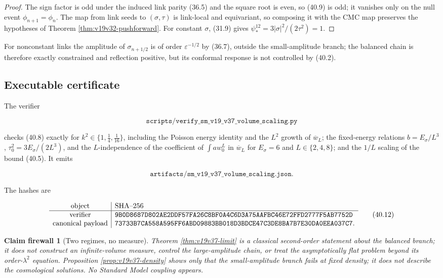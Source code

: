 \documentclass[11pt]{article}
\newtheorem{firewall}[theorem]{Claim firewall}
\theoremstyle{remark}
\begin{document}
\begin{proof}
The sign factor is odd under the induced link parity (36.5) and the
square root is even, so (40.9) is odd; it vanishes only on the null
event \(\phi_{n+1}=\phi_n\).  The map from link seeds to
\((\sigma,\tau)\) is link-local and equivariant, so composing it with the
CMC map preserves the hypotheses of Theorem
\ref{thm:v19v32-pushforward}.  For constant \(\sigma\), (31.9) gives
\(\psi_*^{12}=3|\sigma|^2/(2\tau^2)=1\).
\end{proof}

For nonconstant links the amplitude of \(\sigma_{n+1/2}\) is of order
\(\varepsilon^{-1/2}\) by (36.7), outside the small-amplitude branch;
the balanced chain is therefore exactly constrained and reflection
positive, but its conformal response is not controlled by (40.2).

\subsection{Executable certificate}

The verifier

\[
 \texttt{scripts/verify\_sm\_v19\_v37\_volume\_scaling.py}         \tag{40.10}
\]

checks (40.8) exactly for \(k^2\in\{1,\tfrac14,\tfrac1{16}\}\),
including the Poisson energy identity and the \(L^2\) growth of
\(\overline w_L\); the fixed-energy relations \(b=E_\sigma/L^3\),
\(\tau_0^2=3E_\sigma/(2L^3)\), and the \(L\)-independence of the
coefficient of \(\int aw_0^L\) in \(\overline w_L\) for \(E_\sigma=6\)
and \(L\in\{2,4,8\}\); and the \(1/L\) scaling of the bound (40.5).  It
emits

\[
 \texttt{artifacts/sm\_v19\_v37\_volume\_scaling.json}.            \tag{40.11}
\]

The hashes are

\[
\begin{array}{c|l}
\hbox{object}&\hbox{SHA--256}\\ \hline
\hbox{verifier}&
\texttt{9B0D8687D802AE2DDF57FA26C8BF0A4C6D3A75AAFBC46E72FFD2777F5AB7752D}\\
\hbox{canonical payload}&
\texttt{73733B7CA558A595FF6ABD09883BB018D3BDCE47C3DE8BA7B7E30DA0EEA037C7}.
\end{array}                                                     \tag{40.12}
\]

\begin{firewall}[Two regimes, no measure]
\label{fire:v19v37}
Theorem \ref{thm:v19v37-limit} is a classical second-order statement
about the balanced branch; it does not construct an infinite-volume
measure, control the large-amplitude chain, or treat the asymptotically
flat problem beyond its order-\(\lambda^2\) equation.  Proposition
\ref{prop:v19v37-density} shows only that the small-amplitude branch
fails at fixed density; it does not describe the cosmological solutions.
No Standard Model coupling appears.
\end{firewall}
\end{document}
